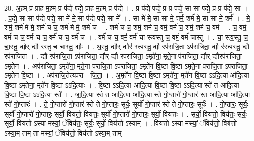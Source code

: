 \documentclass[17pt]{extarticle}
\begin{document}
20. अ॒हम् प्र प्राह म॒हम् प्र प॑द्ये पद्ये॒ प्राह म॒हम् प्र प॑द्ये । . प्र प॑द्ये पद्ये॒ प्र प्र प॑द्ये॒ सा सा प॑द्ये॒ प्र प्र प॑द्ये॒ सा । . प॒द्ये॒ सा सा प॑द्ये पद्ये॒ सा मे॑ मे॒ सा प॑द्ये पद्ये॒ सा मे᳚ । . सा मे॑ मे॒ सा सा मे॒ शर्म॒ शर्म॑ मे॒ सा सा मे॒ शर्म॑ । . मे॒ शर्म॒ शर्म॑ मे मे॒ शर्म॑ च च॒ शर्म॑ मे मे॒ शर्म॑ च । . शर्म॑ च च॒ शर्म॒ शर्म॑ च॒ वर्म॒ वर्म॑ च॒ शर्म॒ शर्म॑ च॒ वर्म॑ । . च॒ वर्म॒ वर्म॑ च च॒ वर्म॑ च च॒ वर्म॑ च च॒ वर्म॑ च । . वर्म॑ च च॒ वर्म॒ वर्म॑ चा स्त्वस्तु च॒ वर्म॒ वर्म॑ चास्तु । . चा॒ स्त्व॒स्तु॒ च॒ चा॒स्तु॒ द्यौर् द्यौ र॑स्तु च चास्तु॒ द्यौः । . अ॒स्तु॒ द्यौर् द्यौर॑ स्त्वस्तु॒ द्यौ रप॑राजि॒ता ऽप॑राजिता॒ द्यौ र॑स्त्वस्तु॒ द्यौ रप॑राजिता । . द्यौ रप॑राजि॒ता ऽप॑राजिता॒ द्यौर् द्यौ रप॑राजिता॒ ऽमृते॑ना॒ मृते॒ना प॑राजिता॒ द्यौर् द्यौरप॑राजिता॒ ऽमृते॑न । . अप॑राजिता॒ ऽमृते॑ना॒ मृते॒ना प॑राजि॒ता ऽप॑राजिता॒ ऽमृते॑न वि॒ष्टा वि॒ष्टा ऽमृते॒ना प॑राजि॒ता ऽप॑राजिता॒ ऽमृते॑न वि॒ष्टा । . अप॑राजि॒तेत्यप॑रा - जि॒ता॒ । . अ॒मृते॑न वि॒ष्टा वि॒ष्टा ऽमृते॑ना॒ मृते॑न वि॒ष्टा ऽऽदि॒त्या आ॑दि॒त्या वि॒ष्टा ऽमृते॑ना॒ मृते॑न वि॒ष्टा ऽऽदि॒त्याः । . वि॒ष्टा ऽऽदि॒त्या आ॑दि॒त्या वि॒ष्टा वि॒ष्टा ऽऽदि॒त्या स्ते॑ त आदि॒त्या वि॒ष्टा वि॒ष्टा ऽऽदि॒त्या स्ते᳚ । . आ॒दि॒त्या स्ते॑ त आदि॒त्या आ॑दि॒त्या स्ते॑ गो॒प्तारो॑ गो॒प्तार॑ स्त आदि॒त्या आ॑दि॒त्या स्ते॑ गो॒प्तारः॑ । . ते॒ गो॒प्तारो॑ गो॒प्तार॑ स्ते ते गो॒प्तारः॒ सूर्यः॒ सूर्यो॑ गो॒प्तार॑ स्ते ते गो॒प्तारः॒ सूर्यः॑ । . गो॒प्तारः॒ सूर्यः॒ सूर्यो॑ गो॒प्तारो॑ गो॒प्तारः॒ सूर्यो॒ विय॑त्तो॒ विय॑त्तः॒ सूर्यो॑ गो॒प्तारो॑ गो॒प्तारः॒ सूर्यो॒ विय॑त्तः । . सूर्यो॒ विय॑त्तो॒ विय॑त्तः॒ सूर्यः॒ सूर्यो॒ विय॑त्तो ऽस्या मस्यां॒ ॅविय॑त्तः॒ सूर्यः॒ सूर्यो॒ विय॑त्तो ऽस्याम् । . विय॑त्तो ऽस्या मस्यां॒ ॅविय॑त्तो॒ विय॑त्तो ऽस्या॒म् ताम् ता म॑स्यां॒ ॅविय॑त्तो॒ विय॑त्तो ऽस्या॒म् ताम् । \newline
\end{document}
